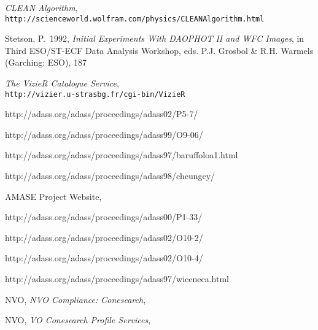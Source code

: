 \documentclass[]{lofar}
\begin{document}
\begin{sloppypar}
\begin{thebibliography}{99}
   {\em CLEAN Algorithm,}\\
  {\tt http://scienceworld.wolfram.com/physics/CLEANAlgorithm.html}
  
   Stetson, P.\ 1992, {\em Initial Experiments With DAOPHOT II
  and WFC Images}, in Third ESO/ST-ECF Data Analysis Workshop,
  eds. P.J. Grosbol \& R.H. Warmels (Garching: ESO), 187
  
   {\em The VizieR Catalogue Service},\\
  {\tt http://vizier.u-strasbg.fr/cgi-bin/VizieR}
  
  {http://adass.org/adass/proceedings/adass02/P5-7/}
  
  {http://adass.org/adass/proceedings/adass99/O9-06/}
  
  {http://adass.org/adass/proceedings/adass97/baruffoloa1.html}
  
  {http://adass.org/adass/proceedings/adass98/cheungcy/}
  
  AMASE Project Website,\\
  
  {http://adass.org/adass/proceedings/adass00/P1-33/}
  
  {http://adass.org/adass/proceedings/adass02/O10-2/}
  
  {http://adass.org/adass/proceedings/adass02/O10-4/}
  
  {http://adass.org/adass/proceedings/adass97/wiceneca.html}
  
   NVO, {\em NVO Compliance: Conesearch},\\
  
   NVO, {\em VO Conesearch Profile Services},\\
  
\end{thebibliography}
\end{sloppypar}
\end{document}
